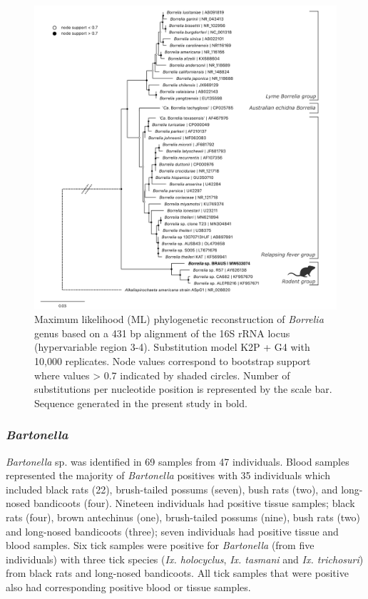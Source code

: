 \documentclass[a4paper, nobind]{templates/ociamthesis}
\begin{document}
\begin{figure}
\includegraphics[width=0.95\linewidth]{figures/ms-figs/Ch3-borreliatree} \caption[Phylogeny of rodent \textit{Borrelia} species.]{Maximum likelihood (ML) phylogenetic reconstruction of \textit{Borrelia} genus based on a 431 bp alignment of the 16S rRNA locus (hypervariable region 3-4). Substitution model K2P + G4 with 10,000 replicates. Node values correspond to bootstrap support where values > 0.7 indicated by shaded circles. Number of substitutions per nucleotide position is represented by the scale bar. Sequence generated in the present study in bold.}\label{fig:F3borrelia}
\end{figure}

\hypertarget{bartonella}{%
\subsubsection{\texorpdfstring{\emph{Bartonella}}{Bartonella}}\label{bartonella}}

\emph{Bartonella} sp. was identified in 69 samples from 47 individuals. Blood samples represented the majority of \emph{Bartonella} positives with 35 individuals which included black rats (22), brush-tailed possums (seven), bush rats (two), and long-nosed bandicoots (four).
Nineteen individuals had positive tissue samples; black rats (four), brown antechinus (one), brush-tailed possums (nine), bush rats (two) and long-nosed bandicoots (three); seven individuals had positive tissue and blood samples.
Six tick samples were positive for \emph{Bartonella} (from five individuals) with three tick species (\emph{Ix. holocyclus}, \emph{Ix. tasmani} and \emph{Ix. trichosuri}) from black rats and long-nosed bandicoots. All tick samples that were positive also had corresponding positive blood or tissue samples.
\end{document}
